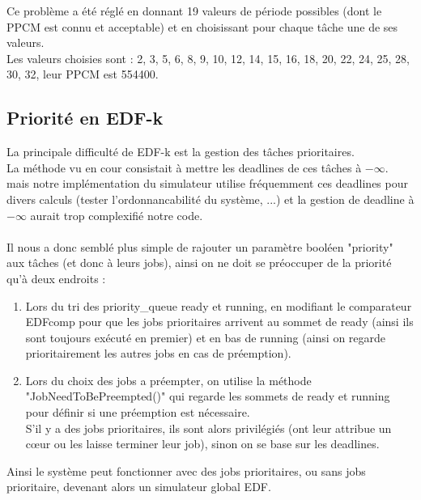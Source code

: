 \documentclass[a4paper,10pt]{article}
\begin{document}
		Ce problème a été réglé en donnant 19 valeurs de période possibles (dont le PPCM est connu et acceptable) et en choisissant pour chaque tâche une 			de ses valeurs.\\

		Les valeurs choisies sont : {2, 3, 5, 6, 8, 9, 10, 12, 14, 15, 16, 18, 20, 22, 24, 25, 28, 30, 32}, leur PPCM est 554400.

	\subsection{Priorité en EDF-k}\hypertarget{prioriteEDFk}{}

		La principale difficulté de EDF-k est la gestion des tâches prioritaires.\\
		La méthode vu en cour consistait à mettre les deadlines de ces tâches à $- \infty$. mais notre implémentation du simulateur utilise fréquemment ces deadlines pour divers calculs (tester l'ordonnancabilité du système, ...) et la gestion de deadline à $- \infty$ aurait trop complexifié notre code.\\
		~\\
		Il nous a donc semblé plus simple de rajouter un paramètre booléen "priority" aux tâches (et donc à leurs jobs), ainsi on ne doit se préoccuper de la priorité qu'à deux endroits :
		\begin{enumerate}
			\item Lors du tri des priority\_queue ready et running, en modifiant le comparateur EDFcomp pour que les jobs prioritaires arrivent au sommet de ready (ainsi ils sont toujours exécuté en premier) et en bas de running (ainsi on regarde prioritairement les autres jobs en cas de préemption).\\
			\item Lors du choix des jobs a préempter, on utilise la méthode "JobNeedToBePreempted()" qui regarde les sommets de ready et running pour définir si une préemption est nécessaire.\\
				S'il y a des jobs prioritaires, ils sont alors privilégiés (ont leur attribue un cœur ou les laisse terminer leur job), sinon on se base sur les deadlines.
		\end{enumerate}
		Ainsi le système peut fonctionner avec des jobs prioritaires, ou sans jobs prioritaire, devenant alors un simulateur global EDF.

\end{document}
